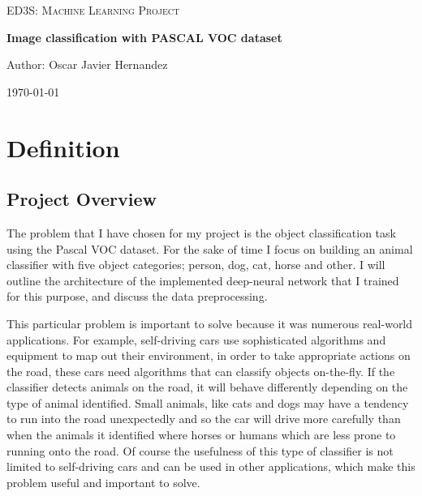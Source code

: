 \documentclass[10pt,a4paper]{article}
\begin{document}

\begin{titlepage}
	\centering
	\vspace{1cm}
	{\scshape\Large ED3S: Machine Learning Project \par}
	\vspace{1.5cm}
	{\huge\bfseries Image classification with PASCAL VOC dataset \par}
	\vspace{1.5cm}
	{\Large Author: Oscar Javier Hernandez\par}
	\vfill

	{\large \today\par}
\end{titlepage}

\section{Definition}
\subsection{Project Overview}\label{sec: overview}
%

The problem that I have chosen for my project is the object classification task using the Pascal VOC dataset. For the sake of time I focus on building an animal classifier with five object categories; person, dog, cat, horse and other. I will outline the architecture of the implemented deep-neural network that I trained for this purpose, and discuss the data preprocessing.

This particular problem is important to solve because it was numerous real-world applications. For example, self-driving cars use sophisticated algorithms and equipment to map out their environment, in order to take appropriate actions on the road, these cars need algorithms that can classify objects on-the-fly. If the classifier detects animals on the road, it will behave differently depending on the type of animal identified. Small animals, like cats and dogs may have a tendency to run into the road unexpectedly and so the car will drive more carefully than when the animals it identified where horses or humans which are less prone to running onto the road. Of course the usefulness of this type of classifier is not limited to self-driving cars and can be used in other applications, which make this problem useful and important to solve.
\end{document}
